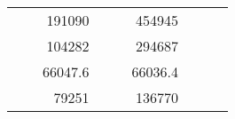 \begin{table}[H]
\begin{tabular}{|ccrccrccc}
\multicolumn{1}{|c|}{\cellcolor[HTML]{FFFFC7}}                                & \multicolumn{1}{c|}{\cellcolor[HTML]{DDFDFF}}                      & \multicolumn{1}{r|}{\cellcolor[HTML]{DAE8FC}191090}    & \multicolumn{1}{c|}{\cellcolor[HTML]{FFFFC7}}                                & \multicolumn{1}{c|}{\cellcolor[HTML]{DDFDFF}}                       & \multicolumn{1}{r|}{\cellcolor[HTML]{DDFDFF}454945}    &                                                                              &                                                                    &                                                        \\ \cline{3-3} \cline{6-6}
\multicolumn{1}{|c|}{\cellcolor[HTML]{FFFFC7}}                                & \multicolumn{1}{c|}{\cellcolor[HTML]{DDFDFF}}                      & \multicolumn{1}{r|}{\cellcolor[HTML]{DDFDFF}104282}    & \multicolumn{1}{c|}{\cellcolor[HTML]{FFFFC7}}                                & \multicolumn{1}{c|}{\cellcolor[HTML]{DDFDFF}}                       & \multicolumn{1}{r|}{\cellcolor[HTML]{DAE8FC}294687}    &                                                                              &                                                                    &                                                        \\ \cline{3-3} \cline{6-6}
\multicolumn{1}{|c|}{\cellcolor[HTML]{FFFFC7}}                                & \multicolumn{1}{c|}{\cellcolor[HTML]{DDFDFF}}                      & \multicolumn{1}{r|}{\cellcolor[HTML]{DAE8FC}66047.6}   & \multicolumn{1}{c|}{\cellcolor[HTML]{FFFFC7}}                                & \multicolumn{1}{c|}{\cellcolor[HTML]{DDFDFF}}                       & \multicolumn{1}{r|}{\cellcolor[HTML]{DDFDFF}66036.4}   &                                                                              &                                                                    &                                                        \\ \cline{3-3} \cline{6-6}
\multicolumn{1}{|c|}{\cellcolor[HTML]{FFFFC7}}                                & \multicolumn{1}{c|}{\cellcolor[HTML]{DDFDFF}}                      & \multicolumn{1}{r|}{\cellcolor[HTML]{DDFDFF}79251}     & \multicolumn{1}{c|}{\cellcolor[HTML]{FFFFC7}}                                & \multicolumn{1}{c|}{\cellcolor[HTML]{DDFDFF}}                       & \multicolumn{1}{r|}{\cellcolor[HTML]{DAE8FC}136770}    &                                                                              &                                                                    &                                                        \\ \cline{3-3} \cline{6-6}

\end{tabular}
\end{table}
